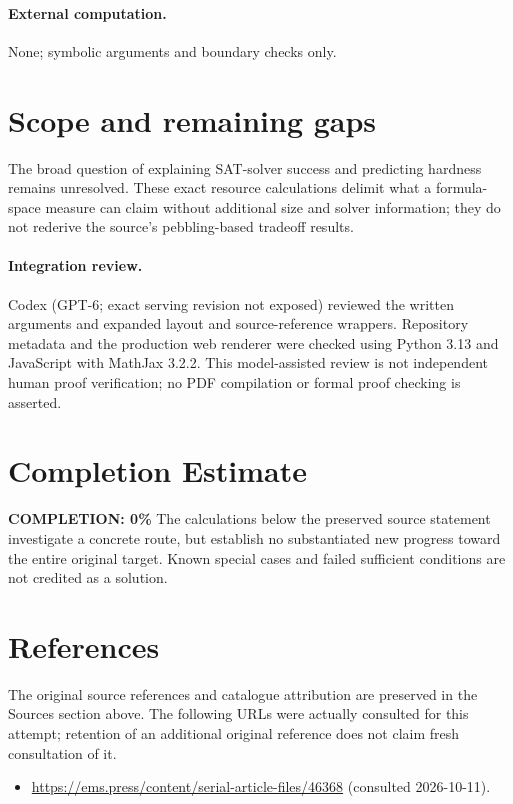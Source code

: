 \documentclass[11pt]{article}
\begin{document}
\paragraph{External computation.} None; symbolic arguments and boundary checks only.
\section{Scope and remaining gaps}
The broad question of explaining SAT-solver success and predicting hardness remains unresolved. These exact resource calculations delimit what a formula-space measure can claim without additional size and solver information; they do not rederive the source's pebbling-based tradeoff results.
\paragraph{Integration review.} Codex (GPT-6; exact serving revision not exposed) reviewed the written arguments and expanded layout and source-reference wrappers. Repository metadata and the production web renderer were checked using Python 3.13 and JavaScript with MathJax 3.2.2. This model-assisted review is not independent human proof verification; no PDF compilation or formal proof checking is asserted.

\section{Completion Estimate}
\noindent\textbf{COMPLETION: 0\%}
The calculations below the preserved source statement investigate a concrete route,
but establish no substantiated new progress toward the entire original target.
Known special cases and failed sufficient conditions are not credited as a solution.
\section{References}
The original source references and catalogue attribution are preserved in the
Sources section above. The following URLs were actually consulted for this attempt;
retention of an additional original reference does not claim fresh consultation of it.
\begin{itemize}
\item \url{https://ems.press/content/serial-article-files/46368} (consulted 2026-10-11). 
\end{itemize}
\end{document}
